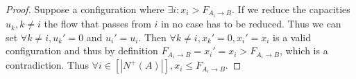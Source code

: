 \begin{proof}
   Suppose a configuration where $\exists i : x_i > F_{A_i \rightarrow B}$. If we reduce the capacities $u_k, k \neq i$
   the flow that passes from $i$ in no case has to be reduced. Thus we can set $\forall k \neq i, u_k' = 0$ and $u_i' =
   u_i$. Then $\forall k \neq i,x_k' = 0, x_i' = x_i$ is a valid configuration and thus by definition $F_{A_i \rightarrow
   B} = x_i' = x_i > F_{A_i \rightarrow B}$, which is a contradiction. Thus $\forall i \in [|N^{+}(A)|], x_i \leq
   F_{A_i \rightarrow B}$.
\end{proof}
